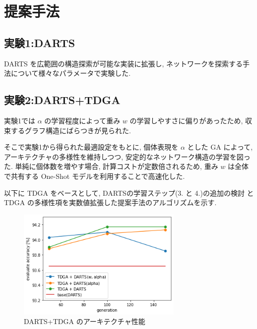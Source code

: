 \documentclass[a4paper,twoside,twocolumn,10pt]{article}
\begin{document}
\section{提案手法}
\subsection{実験1:DARTS}
DARTS を広範囲の構造探索が可能な実装に拡張し, ネットワークを探索する手法について様々なパラメータで実験した.

\subsection{実験2:DARTS+TDGA}

実験1では $\alpha$ の学習程度によって重み $w$ の学習しやすさに偏りがあったため,
収束するグラフ構造にばらつきが見られた.

そこで実験1から得られた最適設定をもとに,
個体表現を $\alpha$ とした GA によって,
アーキテクチャの多様性を維持しつつ, 安定的なネットワーク構造の学習を図った.
単純に個体数を増やす場合, 計算コストが定数倍されるため,
重み $w$ は全体で共有する One-Shot モデルを利用することで高速化した.

以下に TDGA をベースとして, DARTSの学習ステップ(3. と 4.)の追加の検討 と TDGA の多様性項を実数値拡張した提案手法のアルゴリズムを示す.

\begin{figure}[t]
  \centering
  \includegraphics[width=80mm]{eval.png}
  \caption{DARTS+TDGA のアーキテクチャ性能}
  \label{fig:eval_tdga}
\end{figure}
\end{document}
